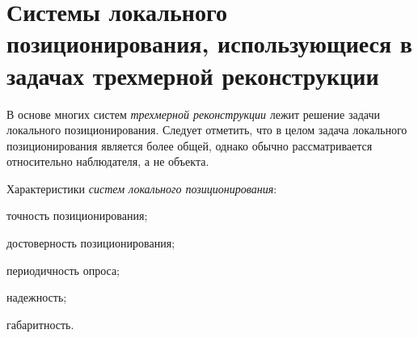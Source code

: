 \section{Системы локального позиционирования, использующиеся в задачах трехмерной реконструкции}
\label{sec_3d_models_positioning}

В основе многих систем \textit{трехмерной реконструкции} лежит решение задачи локального позиционирования. Следует отметить, что в целом задача локального позиционирования является более общей, однако обычно рассматривается относительно наблюдателя, а не объекта.

\begin{SCn}
\end{SCn}

Характеристики \textit{систем локального позиционирования}:
\begin{textitemize}
    \item точность позиционирования;
    \item достоверность позиционирования;
    \item периодичность опроса;
    \item надежность;
    \item габаритность.
\end{textitemize}

